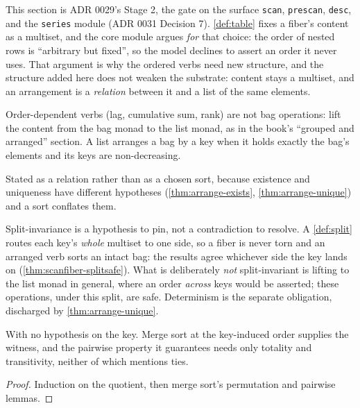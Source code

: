 This section is ADR 0029's Stage 2, the gate on the surface \texttt{scan},
\texttt{prescan}, \texttt{desc}, and the \texttt{series} module (ADR 0031
Decision 7).  \ref{def:table} fixes a fiber's content as a multiset, and the
core module argues \emph{for} that choice: the order of nested rows is
``arbitrary but fixed'', so the model declines to assert an order it never
uses.  That argument is why the ordered verbs need new structure, and the
structure added here does not weaken the substrate: content stays a
multiset, and an arrangement is a \emph{relation} between it and a list of
the same elements.

\begin{definition}
  \label{def:arranged}\leanok
  Order-dependent verbs (lag, cumulative sum, rank) are not bag
  operations: lift the content from the bag monad to the list monad, as in
  the book's ``grouped and arranged'' section.  A list arranges a bag by a
  key when it holds exactly the bag's elements and its keys are
  non-decreasing.

  Stated as a relation rather than as a chosen sort, because existence and
  uniqueness have different hypotheses (\ref{thm:arrange-exists},
  \ref{thm:arrange-unique}) and a sort conflates them.

  Split-invariance is a hypothesis to pin, not a contradiction to resolve.
  A \ref{def:split} routes each key's \emph{whole} multiset to one side, so
  a fiber is never torn and an arranged verb sorts an intact bag: the
  results agree whichever side the key lands on
  (\ref{thm:scanfiber-splitsafe}).  What is deliberately \emph{not}
  split-invariant is lifting to the list monad in general, where an order
  \emph{across} keys would be asserted; these operations, under this split,
  are safe.  Determinism is the separate obligation, discharged by
  \ref{thm:arrange-unique}.
\end{definition}

\begin{theorem}
  \label{thm:arrange-exists}\leanok
  With no hypothesis on the key.  Merge sort at the key-induced order
  supplies the witness, and the pairwise property it guarantees needs only
  totality and transitivity, neither of which mentions ties.
\end{theorem}
\begin{proof}\leanok
  Induction on the quotient, then merge sort's permutation and pairwise
  lemmas.
\end{proof}

